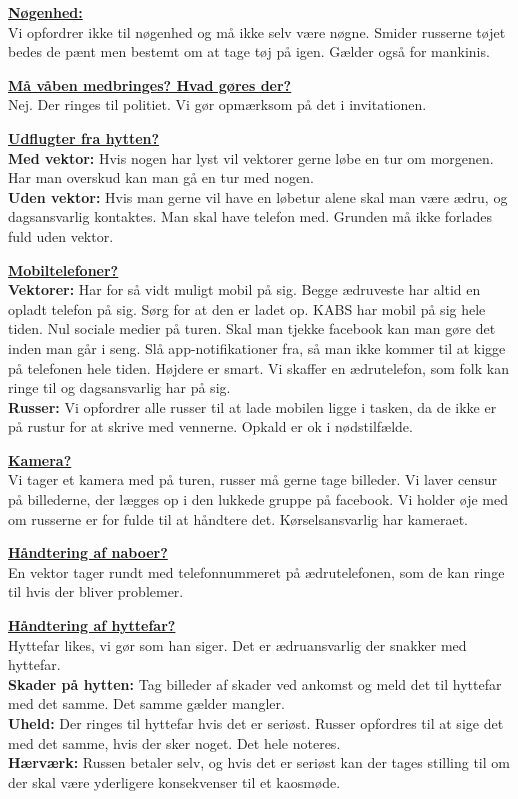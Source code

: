 \underline{\textbf{Nøgenhed:}}\\
Vi opfordrer ikke til nøgenhed og må ikke selv være nøgne. Smider russerne tøjet bedes de pænt men bestemt om at tage tøj på igen. Gælder også for mankinis. 

\underline{\textbf{Må våben medbringes? Hvad gøres der?}}\\
Nej. Der ringes til politiet. Vi gør opmærksom på det i invitationen. 

\underline{\textbf{Udflugter fra hytten?}}\\
\textbf{Med vektor:} Hvis nogen har lyst vil vektorer gerne løbe en tur om morgenen. Har man overskud kan man gå en tur med nogen.\\ 
\textbf{Uden vektor:} Hvis man gerne vil have en løbetur alene skal man være ædru, og dagsansvarlig kontaktes. Man skal have telefon med. Grunden må ikke forlades fuld uden vektor.

\underline{\textbf{Mobiltelefoner?}}\\
\textbf{Vektorer:} Har for så vidt muligt mobil på sig. Begge ædruveste har altid en opladt telefon på sig. Sørg for at den er ladet op. KABS har mobil på sig hele tiden. Nul sociale medier på turen. Skal man tjekke facebook kan man gøre det inden man går i seng. Slå app-notifikationer fra, så man ikke kommer til at kigge på telefonen hele tiden. Højdere er smart. Vi skaffer en ædrutelefon, som folk kan ringe til og dagsansvarlig har på sig.\\
\textbf{Russer:} Vi opfordrer alle russer til at lade mobilen ligge i tasken, da de ikke er på rustur for at skrive med vennerne. Opkald er ok i nødstilfælde.

\underline{\textbf{Kamera?}}\\
Vi tager et kamera med på turen, russer må gerne tage billeder. Vi laver censur på billederne, der lægges op i den lukkede gruppe på facebook. Vi holder øje med om russerne er for fulde til at håndtere det. Kørselsansvarlig har kameraet.

\underline{\textbf{Håndtering af naboer?}}\\
En vektor tager rundt med telefonnummeret på ædrutelefonen, som de kan ringe til hvis der bliver problemer. 

\underline{\textbf{Håndtering af hyttefar?}}\\
Hyttefar likes, vi gør som han siger. Det er ædruansvarlig der snakker med hyttefar.\\
\textbf{Skader på hytten:} Tag billeder af skader ved ankomst og meld det til hyttefar med det samme. Det samme gælder mangler.\\
\textbf{Uheld:} Der ringes til hyttefar hvis det er seriøst. Russer opfordres til at sige det med det samme, hvis der sker noget. Det hele noteres.\\
\textbf{Hærværk:} Russen betaler selv, og hvis det er seriøst kan der tages stilling til om der skal være yderligere konsekvenser til et kaosmøde.

